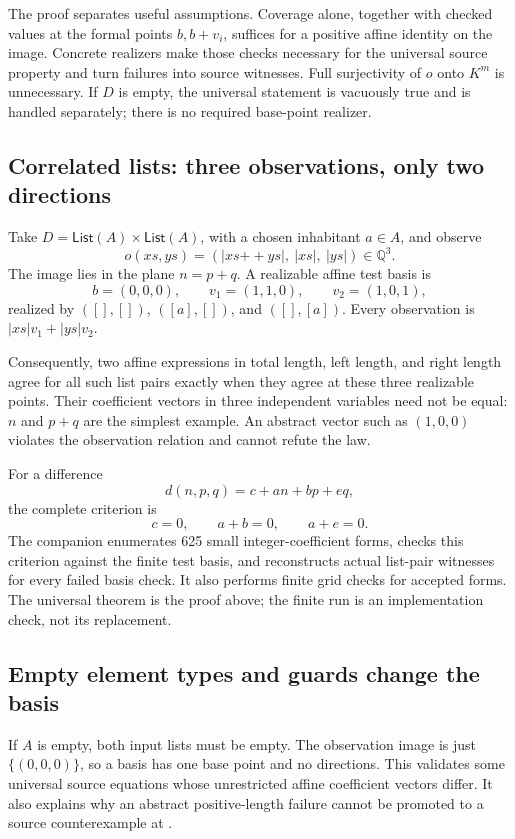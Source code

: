 \documentclass[11pt,a4paper]{article}
\newcommand{\code}[1]{\texttt{\detokenize{#1}}}
\newcommand{\Q}{\mathbb Q}
\theoremstyle{definition}
\theoremstyle{remark}
\begin{document}
The proof separates useful assumptions. Coverage alone, together with checked
values at the formal points $b,b+v_i$, suffices for a positive affine identity
on the image. Concrete realizers make those checks necessary for the universal
source property and turn failures into source witnesses. Full surjectivity of
$o$ onto $K^m$ is unnecessary. If $D$ is empty, the universal statement is
vacuously true and is handled separately; there is no required base-point
realizer.

\subsection{Correlated lists: three observations, only two directions}

Take $D=\mathsf{List}(A)\times\mathsf{List}(A)$, with a chosen inhabitant
$a\in A$, and observe
\[
 o(xs,ys)=(|xs\mathbin{+\!+}ys|,\ |xs|,\ |ys|)\in\Q^3.
\]
The image lies in the plane $n=p+q$. A realizable affine test basis is
\[
 b=(0,0,0),\qquad v_1=(1,1,0),\qquad v_2=(1,0,1),
\]
realized by $([],[])$, $([a],[])$, and $([],[a])$. Every observation is
$|xs|v_1+|ys|v_2$.

Consequently, two affine expressions in total length, left length, and right
length agree for all such list pairs exactly when they agree at these three
realizable points. Their coefficient vectors in three independent variables
need not be equal: $n$ and $p+q$ are the simplest example. An abstract vector
such as $(1,0,0)$ violates the observation relation and cannot refute the law.

For a difference
\[
 d(n,p,q)=c+an+bp+eq,
\]
the complete criterion is
\[
 c=0,\qquad a+b=0,\qquad a+e=0.
\]
The companion enumerates 625 small integer-coefficient forms, checks this
criterion against the finite test basis, and reconstructs actual list-pair
witnesses for every failed basis check. It also performs finite grid checks
for accepted forms. The universal theorem is the proof above; the finite run
is an implementation check, not its replacement.

\subsection{Empty element types and guards change the basis}

If $A$ is empty, both input lists must be empty. The observation image is just
$\{(0,0,0)\}$, so a basis has one base point and no directions. This validates
some universal source equations whose unrestricted affine coefficient vectors
differ. It also explains why an abstract positive-length failure cannot be
promoted to a source counterexample at \code{List Empty}.
\end{document}
